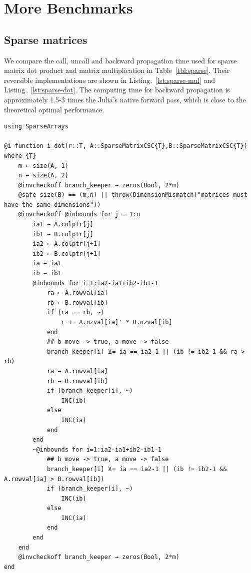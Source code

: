 \documentclass{article}
\newcommand{\<}{\langle}
\renewcommand{\>}{\rangle}
\newcommand{\Lst}[1]{Listing.~\ref{#1}}
\newcommand{\Tbl}[1]{Table~\ref{#1}}
\theoremstyle{definition}\newtheorem{definition}{\textit{Definition}}
\begin{document}
\section{More Benchmarks}\label{app:morebenchmarks}
\subsection{Sparse matrices}\label{sec:benchsparse}
We compare the call, uncall and backward propagation time used for sparse matrix dot product and matrix multiplication in \Tbl{tbl:sparse}. Their reversible implementations are shown in \Lst{lst:sparse-mul} and \Lst{lst:sparse-dot}.
The computing time for backward propagation is approximately 1.5-3 times the Julia's native forward pass, which is close to the theoretical optimal performance.

\begin{minipage}{.88\textwidth}
\begin{lstlisting}[mathescape=false,caption={Reversible sparse matrix multiplication.},label={lst:sparse-mul}, frame=tlrb]
using SparseArrays

@i function i_dot(r::T, A::SparseMatrixCSC{T},B::SparseMatrixCSC{T}) where {T}
    m ← size(A, 1)
    n ← size(A, 2)
    @invcheckoff branch_keeper ← zeros(Bool, 2*m)
    @safe size(B) == (m,n) || throw(DimensionMismatch("matrices must have the same dimensions"))
    @invcheckoff @inbounds for j = 1:n
        ia1 ← A.colptr[j]
        ib1 ← B.colptr[j]
        ia2 ← A.colptr[j+1]
        ib2 ← B.colptr[j+1]
        ia ← ia1
        ib ← ib1
        @inbounds for i=1:ia2-ia1+ib2-ib1-1
            ra ← A.rowval[ia]
            rb ← B.rowval[ib]
            if (ra == rb, ~)
                r += A.nzval[ia]' * B.nzval[ib]
            end
            ## b move -> true, a move -> false
            branch_keeper[i] ⊻= ia == ia2-1 || (ib != ib2-1 && ra > rb)
            ra → A.rowval[ia]
            rb → B.rowval[ib]
            if (branch_keeper[i], ~)
                INC(ib)
            else
                INC(ia)
            end
        end
        ~@inbounds for i=1:ia2-ia1+ib2-ib1-1
            ## b move -> true, a move -> false
            branch_keeper[i] ⊻= ia == ia2-1 || (ib != ib2-1 && A.rowval[ia] > B.rowval[ib])
            if (branch_keeper[i], ~)
                INC(ib)
            else
                INC(ia)
            end
        end
    end
    @invcheckoff branch_keeper → zeros(Bool, 2*m)
end
\end{lstlisting}
\end{minipage}
\end{document}
